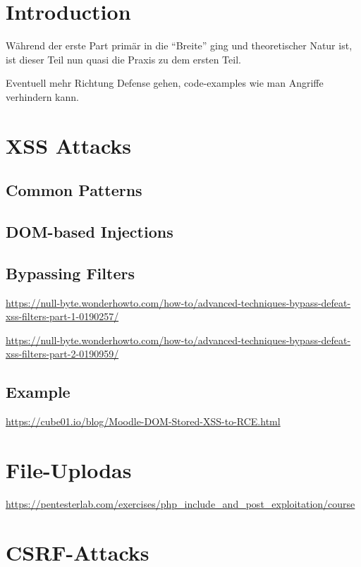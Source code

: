 \chapter{Introduction}

Während der erste Part primär in die ``Breite'' ging und theoretischer Natur ist, ist dieser Teil nun quasi die Praxis zu dem ersten Teil.

Eventuell mehr Richtung Defense gehen, code-examples wie man Angriffe verhindern kann.

\chapter{XSS Attacks}

\section{Common Patterns}

\section{DOM-based Injections}

\section{Bypassing Filters}

\url{https://null-byte.wonderhowto.com/how-to/advanced-techniques-bypass-defeat-xss-filters-part-1-0190257/}

\url{https://null-byte.wonderhowto.com/how-to/advanced-techniques-bypass-defeat-xss-filters-part-2-0190959/}

\section{Example}

\url{https://cube01.io/blog/Moodle-DOM-Stored-XSS-to-RCE.html}

\chapter{File-Uplodas}

\url{https://pentesterlab.com/exercises/php_include_and_post_exploitation/course}

\chapter{CSRF-Attacks}

